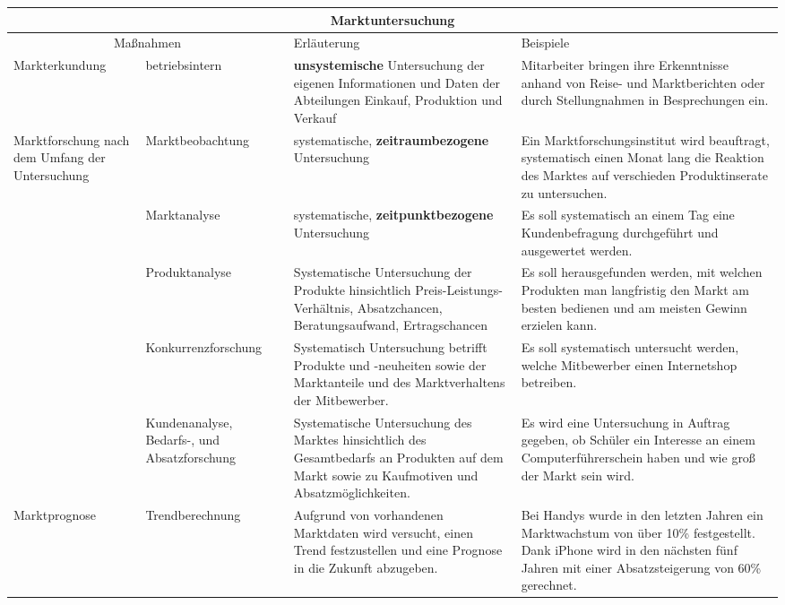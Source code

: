 \noindent \begin{tabular}{|p{}|
				 p{}|
				 p{}|
				 p{}|} %
	\hline
	\multicolumn{4}{|c|}{{{\bf{\large Marktuntersuchung}}}} \\
	\hline
	\multicolumn{2}{|c|}{Maßnahmen} & Erläuterung & Beispiele \\
	\hline
Markterkundung & betriebsintern & {\bf unsystemische} Untersuchung der eigenen Informationen und Daten der Abteilungen Einkauf, Produktion und Verkauf & Mitarbeiter bringen ihre Erkenntnisse anhand von Reise- und Marktberichten oder durch Stellungnahmen in Besprechungen ein. \\
	\hline
Marktforschung nach dem Umfang der Untersuchung & Marktbeobachtung
& systematische, {\bf zeitraumbezogene} Untersuchung & Ein Marktforschungsinstitut wird beauftragt, systematisch einen Monat lang die Reaktion des Marktes auf verschieden Produktinserate zu untersuchen. \\
	\cline{2-4}
& Marktanalyse & systematische, {\bf zeitpunktbezogene} Untersuchung & Es soll systematisch an einem Tag eine Kundenbefragung durchgeführt und ausgewertet werden. \\
	\cline{2-4}
& Produktanalyse & Systematische Untersuchung der Produkte hinsichtlich Preis-Leistungs-Verhältnis, Absatzchancen, Beratungsaufwand, Ertragschancen & Es soll herausgefunden werden, mit welchen Produkten man langfristig den Markt am besten bedienen und am meisten Gewinn erzielen kann. \\
	\cline{2-4}
& Konkurrenzforschung & Systematisch Untersuchung betrifft Produkte und -neuheiten sowie der Marktanteile und des Marktverhaltens der Mitbewerber. & Es soll systematisch untersucht werden, welche Mitbewerber einen Internetshop betreiben. \\
	\cline{2-4}
& Kundenanalyse, Bedarfs-, und Absatzforschung & Systematische Untersuchung des Marktes hinsichtlich des Gesamtbedarfs an Produkten auf dem Markt sowie zu Kaufmotiven und Absatzmöglichkeiten. & Es wird eine Untersuchung in Auftrag gegeben, ob Schüler ein Interesse an einem Computerführerschein haben und wie groß der Markt sein wird. \\
	\hline
Marktprognose & Trendberechnung & Aufgrund von vorhandenen Marktdaten wird versucht, einen Trend festzustellen und eine Prognose in die Zukunft abzugeben. & Bei Handys wurde in den letzten Jahren ein Marktwachstum von über 10\% festgestellt. Dank iPhone wird in den nächsten fünf Jahren mit einer Absatzsteigerung von 60\% gerechnet. \\
	\hline
\end{tabular}


